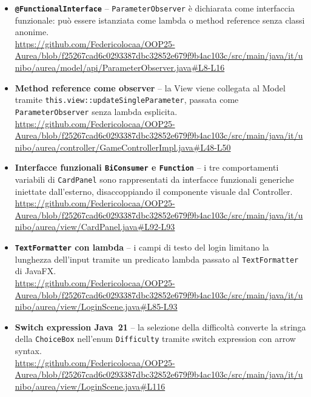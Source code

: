 \documentclass[11pt, a4paper, oneside]{report}
\begin{document}
\begin{itemize}
    \item \textbf{\texttt{@FunctionalInterface}} -- \texttt{ParameterObserver}
        è dichiarata come interfaccia funzionale: può essere istanziata
        come lambda o method reference senza classi anonime. \\
        \url{https://github.com/Federicolocaa/OOP25-Aurea/blob/f25267cad6c0293387dbc32852e679f9b4ac103c/src/main/java/it/unibo/aurea/model/api/ParameterObserver.java#L8-L16}

    \item \textbf{Method reference come observer} -- la View viene collegata
        al Model tramite \texttt{this.view::updateSingleParameter}, passata
        come \texttt{ParameterObserver} senza lambda esplicita. \\
        \url{https://github.com/Federicolocaa/OOP25-Aurea/blob/f25267cad6c0293387dbc32852e679f9b4ac103c/src/main/java/it/unibo/aurea/controller/GameControllerImpl.java#L48-L50}

    \item \textbf{Interfacce funzionali \texttt{BiConsumer} e \texttt{Function}} --
        i tre comportamenti variabili di \texttt{CardPanel} sono rappresentati
        da interfacce funzionali generiche iniettate dall'esterno, disaccoppiando il
        componente visuale dal Controller. \\
        \url{https://github.com/Federicolocaa/OOP25-Aurea/blob/f25267cad6c0293387dbc32852e679f9b4ac103c/src/main/java/it/unibo/aurea/view/CardPanel.java#L92-L93}
        
    \item \textbf{\texttt{TextFormatter} con lambda} -- i campi di testo
        del login limitano la lunghezza dell'input tramite un predicato
        lambda passato al \texttt{TextFormatter} di JavaFX. \\
        \url{https://github.com/Federicolocaa/OOP25-Aurea/blob/f25267cad6c0293387dbc32852e679f9b4ac103c/src/main/java/it/unibo/aurea/view/LoginScene.java#L85-L93}

    \item \textbf{Switch expression Java~21} -- la selezione della difficoltà
        converte la stringa della \texttt{ChoiceBox} nell'enum
        \texttt{Difficulty} tramite switch expression con arrow syntax. \\
        \url{https://github.com/Federicolocaa/OOP25-Aurea/blob/f25267cad6c0293387dbc32852e679f9b4ac103c/src/main/java/it/unibo/aurea/view/LoginScene.java#L116}


\end{itemize}
\end{document}
